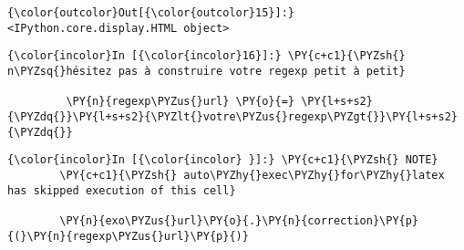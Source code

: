 \begin{Verbatim}[commandchars=\\\{\}]
{\color{outcolor}Out[{\color{outcolor}15}]:} <IPython.core.display.HTML object>
\end{Verbatim}
            
    \begin{Verbatim}[commandchars=\\\{\}]
{\color{incolor}In [{\color{incolor}16}]:} \PY{c+c1}{\PYZsh{} n\PYZsq{}hésitez pas à construire votre regexp petit à petit}
         
         \PY{n}{regexp\PYZus{}url} \PY{o}{=} \PY{l+s+s2}{\PYZdq{}}\PY{l+s+s2}{\PYZlt{}votre\PYZus{}regexp\PYZgt{}}\PY{l+s+s2}{\PYZdq{}}
\end{Verbatim}


    \begin{Verbatim}[commandchars=\\\{\}]
{\color{incolor}In [{\color{incolor} }]:} \PY{c+c1}{\PYZsh{} NOTE}
        \PY{c+c1}{\PYZsh{} auto\PYZhy{}exec\PYZhy{}for\PYZhy{}latex has skipped execution of this cell}
        
        \PY{n}{exo\PYZus{}url}\PY{o}{.}\PY{n}{correction}\PY{p}{(}\PY{n}{regexp\PYZus{}url}\PY{p}{)}
\end{Verbatim}



    
    
    
